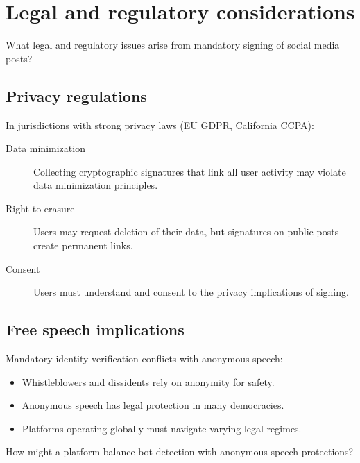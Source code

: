 \section{Legal and regulatory considerations}\label{BotLegal}


\begin{exercise}
  What legal and regulatory issues arise from mandatory signing of social 
  media posts?
\end{exercise}

\subsection{Privacy regulations}

In jurisdictions with strong privacy laws (EU \ac{GDPR}, California CCPA):
\begin{description}
  \item[Data minimization] Collecting cryptographic signatures that link all 
    user activity may violate data minimization principles.
  \item[Right to erasure] Users may request deletion of their data, but 
    signatures on public posts create permanent links.
  \item[Consent] Users must understand and consent to the privacy implications 
    of signing.
\end{description}

\subsection{Free speech implications}

Mandatory identity verification conflicts with anonymous speech:
\begin{itemize}
  \item Whistleblowers and dissidents rely on anonymity for safety.
  \item Anonymous speech has legal protection in many democracies.
  \item Platforms operating globally must navigate varying legal regimes.
\end{itemize}

\begin{exercise}
  How might a platform balance bot detection with anonymous speech 
  protections?
\end{exercise}

